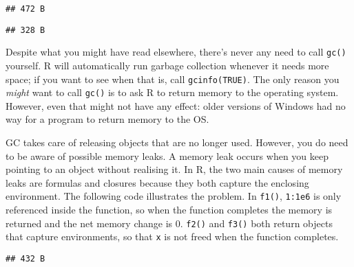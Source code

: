 \begin{verbatim}
## 472 B
\end{verbatim}

\begin{Shaded}
\begin{Highlighting}[]
\NormalTok{(}
\end{Highlighting}
\end{Shaded}

\begin{verbatim}
## 328 B
\end{verbatim}

Despite what you might have read elsewhere, there's never any need to
call \texttt{gc()} yourself. R will automatically run garbage collection
whenever it needs more space; if you want to see when that is, call
\texttt{gcinfo(TRUE)}. The only reason you \emph{might} want to call
\texttt{gc()} is to ask R to return memory to the operating system.
However, even that might not have any effect: older versions of Windows
had no way for a program to return memory to the OS. 

GC takes care of releasing objects that are no longer used. However, you
do need to be aware of possible memory leaks. A memory leak occurs when
you keep pointing to an object without realising it. In R, the two main
causes of memory leaks are formulas and closures because they both
capture the enclosing environment. The following code illustrates the
problem. In \texttt{f1()}, \texttt{1:1e6} is only referenced inside the
function, so when the function completes the memory is returned and the
net memory change is 0. \texttt{f2()} and \texttt{f3()} both return
objects that capture environments, so that \texttt{x} is not freed when
the function completes. 

\begin{Shaded}
\begin{Highlighting}[]
\StringTok{ }\NormalTok{() \{}
\StringTok{ }\OperatorTok{:}
\NormalTok{\}}
\StringTok{ }\NormalTok{())}
\end{Highlighting}
\end{Shaded}

\begin{verbatim}
## 432 B
\end{verbatim}

